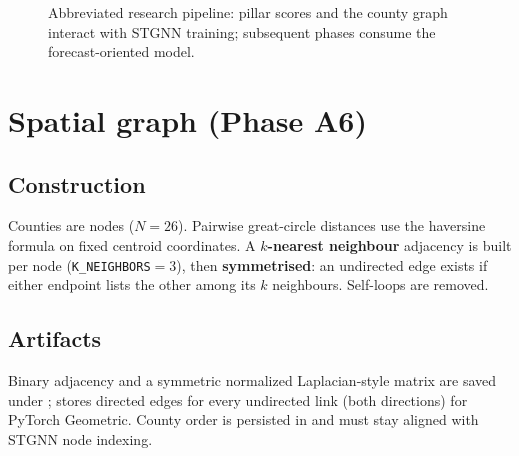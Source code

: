 \documentclass[11pt,a4paper]{article}
\begin{document}
\begin{figure}[H]
  \centering
  \caption{Abbreviated research pipeline: pillar scores and the county graph interact with STGNN training; subsequent phases consume the forecast-oriented model.}
  \label{fig:pipeline}
\end{figure}

\section{Spatial graph (Phase A6)}
\subsection{Construction}
Counties are nodes ($N=26$). Pairwise great-circle distances use the haversine formula on fixed centroid coordinates. A \textbf{$k$-nearest neighbour} adjacency is built per node (\texttt{K\_NEIGHBORS}${}=3$), then \textbf{symmetrised}: an undirected edge exists if either endpoint lists the other among its $k$ neighbours. Self-loops are removed.

\subsection{Artifacts}
Binary adjacency and a symmetric normalized Laplacian-style matrix are saved under ;  stores directed edges for every undirected link (both directions) for PyTorch Geometric. County order is persisted in  and must stay aligned with STGNN node indexing.
\end{document}
